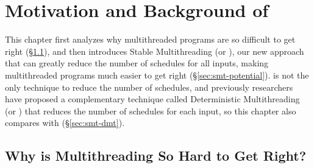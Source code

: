 \chapter{Motivation and Background of \smt}
\label{sec:smt-motivation}

This chapter first analyzes why multithreaded programs are so
difficult to get right (\S\ref{sec:smt-why}), and then introduces
Stable Multithreading (or \smt), our new approach that can greatly reduce the
number of schedules for all inputs, making multithreaded programs much easier to
get right (\S\ref{sec:smt-potential}). \smt is not the only technique to reduce
the number of schedules, and previously researchers have proposed a
complementary technique called Deterministic Multithreading (or \dmt) that
reduces the number of schedules for each input, so this chapter also compares
\smt with \dmt (\S\ref{sec:smt-dmt}).

\section{Why is Multithreading So Hard to Get Right?}
\label{sec:smt-why}

